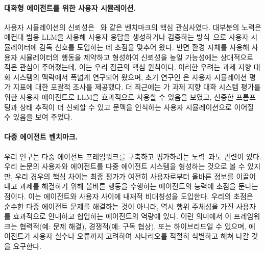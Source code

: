 \paragraph{대화형 에이전트를 위한 사용자 시뮬레이션.}
사용자 시뮬레이션의 신뢰성은 \taubench~\cite{yao2024tau}와 같은 벤치마크의 핵심 관심사였다. 대부분의 노력은 예컨대 범용 LLM을 사용해 사용자 응답을 생성하거나 검증하는 방식~\cite{prabhakar2025apigen}으로 사용자 시뮬레이터에 감독 신호를 도입하는 데 초점을 맞추어 왔다. 반면 환경 자체를 사용해 사용자 시뮬레이터의 행동을 제약하고 형성하여 신뢰성을 높일 가능성에는 상대적으로 적은 관심이 주어졌는데, 이는 우리 접근의 핵심 원칙이다. 이러한 우려는 과제 지향 대화 시스템의 맥락에서 폭넓게 연구되어 왔으며, 초기 연구인 \cite{pietquin_survey_2013}은 사용자 시뮬레이션 평가 지표에 대한 포괄적 조사를 제공했다. 더 최근에는 \cite{kazi_large_2024}가 과제 지향 대화 시스템 평가를 위한 사용자-에이전트로 LLM을 효과적으로 사용할 수 있음을 보였고, 신중한 프롬프팅과 상태 추적이 더 신뢰할 수 있고 문맥을 인식하는 사용자 시뮬레이션으로 이어질 수 있음을 보여 주었다.

\paragraph{다중 에이전트 벤치마크.}
우리 연구는 다중 에이전트 프레임워크를 구축하고 평가하려는 노력~\cite{zhu2025multiagentbench}과도 관련이 있다.
우리 논문의 사용자와 에이전트를 다중 에이전트 시스템을 형성하는 것으로 볼 수 있지만, 우리 경우의 핵심 차이는 최종 평가가 여전히 사용자로부터 올바른 정보를 이끌어 내고 과제를 해결하기 위해 올바른 행동을 수행하는 에이전트의 능력에 초점을 둔다는 점이다. 이는 에이전트와 사용자 사이에 내재적 비대칭성을 도입한다. 우리의 초점은 순수한 다중 에이전트 문제를 해결하는 것이 아니라, 역시 행위 주체성을 가진 사용자를 효과적으로 안내하고 협업하는 에이전트의 역량에 있다. 이런 의미에서 이 프레임워크는 협력적(예: 문제 해결), 경쟁적(예: 구독 협상), 또는 하이브리드일 수 있으며, 에이전트가 사용자 실수나 오류까지 고려하여 시나리오를 적절히 식별하고 헤쳐 나갈 것을 요구한다.
